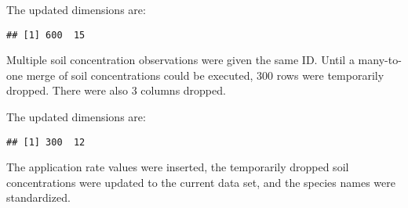 \documentclass[
]{article}
\newenvironment{Shaded}{\begin{snugshade}}{\end{snugshade}}
\newcommand{\CommentTok}[1]{\textcolor[rgb]{0.56,0.35,0.01}{\textit{#1}}}
\newcommand{\KeywordTok}[1]{\textcolor[rgb]{0.13,0.29,0.53}{\textbf{#1}}}
\newcommand{\NormalTok}[1]{#1}
\newcommand{\OperatorTok}[1]{\textcolor[rgb]{0.81,0.36,0.00}{\textbf{#1}}}
\newcommand{\StringTok}[1]{\textcolor[rgb]{0.31,0.60,0.02}{#1}}
\begin{document}
The updated dimensions are:

\begin{verbatim}
## [1] 600  15
\end{verbatim}

Multiple soil concentration observations were given the same ID. Until a
many-to-one merge of soil concentrations could be executed, 300 rows
were temporarily dropped. There were also 3 columns dropped.

\begin{Shaded}
\end{Shaded}

The updated dimensions are:

\begin{verbatim}
## [1] 300  12
\end{verbatim}

The application rate values were inserted, the temporarily dropped soil
concentrations were updated to the current data set, and the species
names were standardized.
\end{document}
